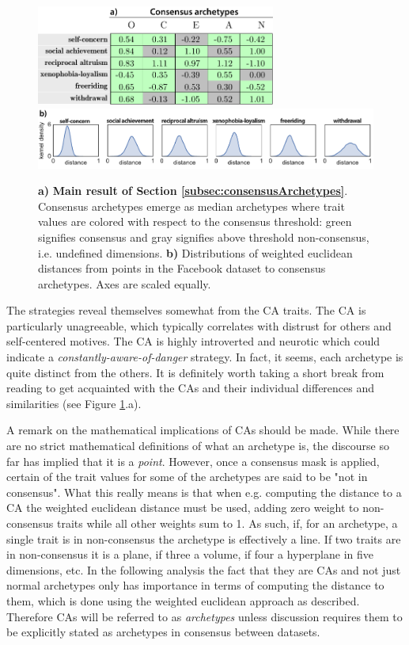 \begin{figure}
	\centering
	\includegraphics[width=0.7\textwidth]{figures/consensusArchetypes}
	\hspace{0.2cm}
	\includegraphics[width=\textwidth]{figures/archetypeDistanceDistributions}
	\caption{\label{fig:consensusArchetypes} \textbf{a)} \textbf{Main result of Section \ref{subsec:consensusArchetypes}}.
	Consensus archetypes emerge as median archetypes where trait values are colored with respect to the consensus threshold: green signifies consensus and gray signifies above threshold non-consensus, i.e.
	undefined dimensions. \textbf{b)} Distributions of weighted euclidean distances from points in the Facebook dataset to consensus archetypes. Axes are scaled equally.}
\end{figure}

The strategies reveal themselves somewhat from the CA traits.
The \achiever CA is particularly unagreeable, which typically correlates with distrust for others and self-centered motives.
The \follower CA is highly introverted and neurotic which could indicate a \textit{constantly-aware-of-danger} strategy.
In fact, it seems, each archetype is quite distinct from the others.
It is definitely worth taking a short break from reading to get acquainted with the CAs and their individual differences and similarities (see Figure \ref{fig:consensusArchetypes}.a).

A remark on the mathematical implications of CAs should be made.
While there are no strict mathematical definitions of what an archetype is, the discourse so far has implied that it is a \textit{point}.
However, once a consensus mask is applied, certain of the trait values for some of the archetypes are said to be "not in consensus".
What this really means is that when e.g. computing the distance to a CA the weighted euclidean distance must be used, adding zero weight to non-consensus traits while all other weights sum to 1.
As such, if, for an archetype, a single trait is in non-consensus the archetype is effectively a line.
If two traits are in non-consensus it is a plane, if three a volume, if four a hyperplane in five dimensions, etc.
In the following analysis the fact that they are CAs and not just normal archetypes only has importance in terms of computing the distance to them, which is done using the weighted euclidean approach as described.
Therefore CAs will be referred to as \textit{archetypes} unless discussion requires them to be explicitly stated as archetypes in consensus between datasets.